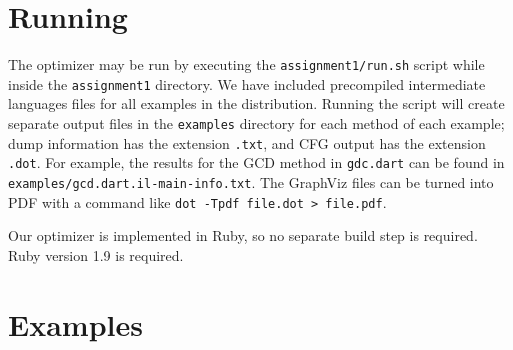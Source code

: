 \documentclass[10pt,twocolumn]{article}
\begin{document}
\section{Running}

The optimizer may be run by executing the \texttt{assignment1/run.sh}
script while inside the \texttt{assignment1} directory. We have
included precompiled intermediate languages files for all examples in
the distribution. Running the script will create separate output files
in the \texttt{examples} directory for each method of each example;
dump information has the extension \texttt{.txt}, and CFG output has
the extension \texttt{.dot}. For example, the results for the GCD
method in \texttt{gdc.dart} can be found in
\texttt{examples/gcd.dart.il-main-info.txt}. The GraphViz files can be
turned into PDF with a command like \texttt{dot -Tpdf file.dot >
  file.pdf}.

Our optimizer is implemented in Ruby, so no separate build step is
required. Ruby version 1.9 is required.

\section{Examples}
\end{document}
